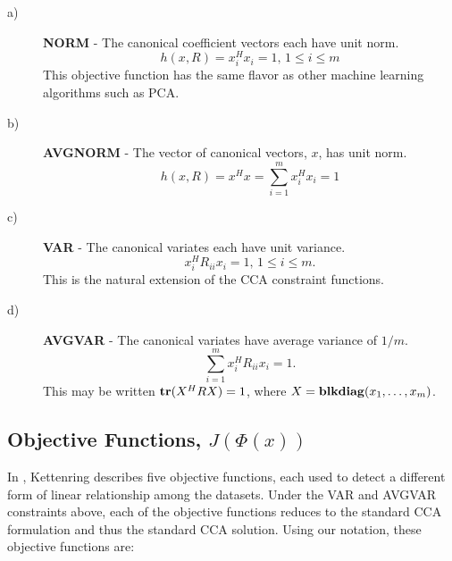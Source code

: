 \begin{description}
\item[a)] \textbf{NORM} - The canonical coefficient vectors each have unit norm.
  \begin{equation*}
    h(x,R) = x_i^Hx_i=1,\, 1\leq i\leq m
  \end{equation*}
  This objective function has the same flavor as other machine learning algorithms such as
  PCA.

\item[b)] \textbf{AVGNORM} - The vector of canonical vectors, $x$, has unit norm.
  \begin{equation*}
    h(x,R) = x^Hx=\sum_{i=1}^mx_i^Hx_i = 1
  \end{equation*}

\item[c)] \textbf{VAR} - The canonical variates each have unit variance.
  \begin{equation*}
    x_i^HR_{ii}x_i = 1,\, 1\leq i\leq m.
  \end{equation*}
  This is the natural extension of the CCA constraint functions. 

\item[d)] \textbf{AVGVAR} - The canonical variates have average variance of $1/m$. 
  \begin{equation*}
    \sum_{i=1}^mx_i^HR_{ii}x_i =1.
  \end{equation*}
  This may be written $\mathop{\bf tr}(X^H RX ) = 1$, where $X = \mathop{\bf blkdiag}(x_1,\dots,x_m)$. 
\end{description}


\subsection{Objective Functions, $J(\Phi(x))$}\label{sec:obj_func}

In \cite{kettenring1971canonical}, Kettenring describes five objective functions, each
used to detect a different form of linear relationship among the datasets. Under the VAR
and AVGVAR constraints above, each of the objective functions reduces to the standard CCA
formulation and thus the standard CCA solution. Using our notation, these objective
functions are:

